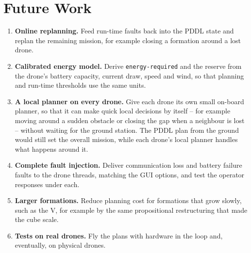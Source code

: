 \documentclass[11pt,a4paper,oneside]{report}
\newcommand{\code}[1]{\texttt{#1}}
\begin{document}
\section{Future Work}
\begin{enumerate}[itemsep=5pt]
  \item \textbf{Online replanning.} Feed run-time faults back into the PDDL state and replan the
        remaining mission, for example closing a formation around a lost drone.
  \item \textbf{Calibrated energy model.} Derive \code{energy-required} and the reserve from the
        drone's battery capacity, current draw, speed and wind, so that planning and run-time
        thresholds use the same units.
  \item \textbf{A local planner on every drone.} Give each drone its own small on-board planner,
        so that it can make quick local decisions by itself -- for example moving around a
        sudden obstacle or closing the gap when a neighbour is lost -- without waiting for the
        ground station. The PDDL plan from the ground would still set the overall mission, while
        each drone's local planner handles what happens around it.
  \item \textbf{Complete fault injection.} Deliver communication loss and battery failure faults
        to the drone threads, matching the GUI options, and test the operator responses under
        each.
  \item \textbf{Larger formations.} Reduce planning cost for formations that grow slowly, such as
        the V, for example by the same propositional restructuring that made the cube scale.
  \item \textbf{Tests on real drones.} Fly the plans with hardware in the loop and, eventually,
        on physical drones.
\end{enumerate}
\end{document}
